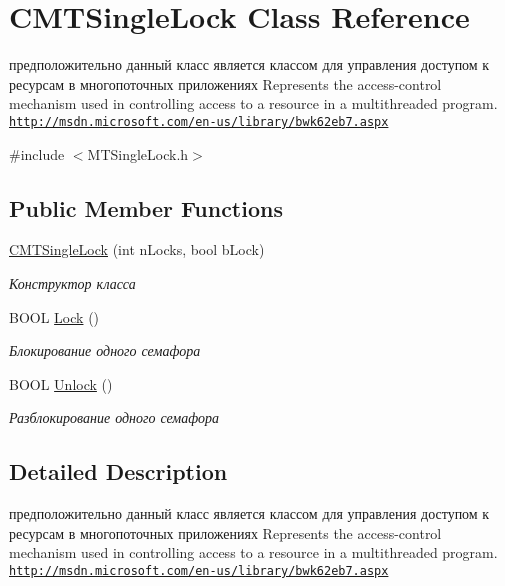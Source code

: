 \hypertarget{class_c_m_t_single_lock}{\section{C\+M\+T\+Single\+Lock Class Reference}
\label{class_c_m_t_single_lock}
}


предположительно данный класс является классом для управления доступом к ресурсам в многопоточных приложениях Represents the access-\/control mechanism used in controlling access to a resource in a multithreaded program. \href{http://msdn.microsoft.com/en-us/library/bwk62eb7.aspx}{\tt http\+://msdn.\+microsoft.\+com/en-\/us/library/bwk62eb7.\+aspx}  




{\ttfamily \#include $<$M\+T\+Single\+Lock.\+h$>$}

\subsection*{Public Member Functions}
\begin{DoxyCompactItemize}
\item 
\hyperlink{class_c_m_t_single_lock_accef84bf825a836b952f32223ec757bc}{C\+M\+T\+Single\+Lock} (int n\+Locks, bool b\+Lock)
\begin{DoxyCompactList}\small\item\em Конструктор класса \end{DoxyCompactList}\item 
B\+O\+O\+L \hyperlink{class_c_m_t_single_lock_a7586857614ac3719accc53d56e97573c}{Lock} ()
\begin{DoxyCompactList}\small\item\em Блокирование одного семафора \end{DoxyCompactList}\item 
B\+O\+O\+L \hyperlink{class_c_m_t_single_lock_a16f80923c0768c3814be13c4061d4c53}{Unlock} ()
\begin{DoxyCompactList}\small\item\em Разблокирование одного семафора \end{DoxyCompactList}\end{DoxyCompactItemize}


\subsection{Detailed Description}
предположительно данный класс является классом для управления доступом к ресурсам в многопоточных приложениях Represents the access-\/control mechanism used in controlling access to a resource in a multithreaded program. \href{http://msdn.microsoft.com/en-us/library/bwk62eb7.aspx}{\tt http\+://msdn.\+microsoft.\+com/en-\/us/library/bwk62eb7.\+aspx} 



